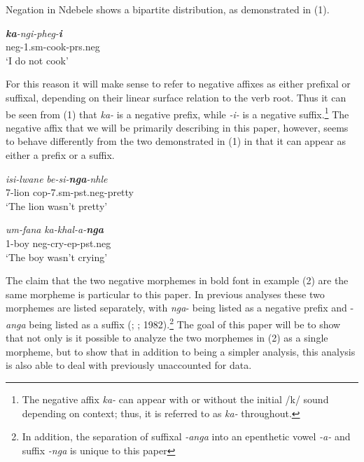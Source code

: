 \documentclass[output=paper]{langsci/langscibook}
\newcommand{\ii}[0]{\textit {-i- }}
\begin{document}
Negation in Ndebele shows a bipartite distribution, as demonstrated in (1).


\begin{exe}
\ex \gll  \textit{\textbf {ka}-ngi-pheg-\textbf{i}}\\
          {\sc neg}-1.{\sc sm}-cook-{\sc prs.neg}\\
    \glt `I do not cook'
\end{exe}


For this reason it will make sense to refer to negative affixes as either prefixal or suffixal, depending on their linear surface relation to the verb root. Thus it can be seen from (1) that \textit{ka-} is a negative prefix, while \ii is a negative suffix.\footnote{The negative affix \textit{ka-} can appear with or without the initial /k/ sound depending on context; thus, it is referred to as \textit{ka-} throughout.} The negative affix that we will be primarily describing in this paper, however, seems to behave differently from the two demonstrated in (1) in that it can appear as either a prefix or a suffix.

\begin{exe}
\ex \begin{xlist}
\ex \gll \textit{isi-lwane}  \textit{be-si-\textbf{nga}-nhle}\\
       7-lion {\sc cop}-7.{\sc sm}-{\sc pst.neg}-pretty\\
    \glt `The lion wasn't pretty' 

\ex \gll \textit{um-fana} \textit{ka-khal-a-\textbf{nga}}\\
         1-boy {\sc neg}-cry-{\sc ep}-{\sc pst.neg}\\
    \glt `The boy wasn't crying'
\end{xlist}
\end{exe}

The claim that the two negative morphemes in bold font in example (2) are the same morpheme is particular to this paper. In previous analyses these two morphemes are listed separately, with \textit{nga}- being listed as a negative prefix and -\textit{anga} being listed as a suffix (\citealt{Sibanda2004}; \citealt{Khumalo1981}; 1982).\footnote{In addition, the separation of suffixal \textit{-anga} into an epenthetic vowel \textit{-a-} and suffix \textit{-nga} is unique to this paper} The goal of this paper will be to show that not only is it possible to analyze the two morphemes in (2) as a single morpheme, but to show that in addition to being a simpler analysis, this analysis is also able to deal with previously unaccounted for data.
\end{document}
